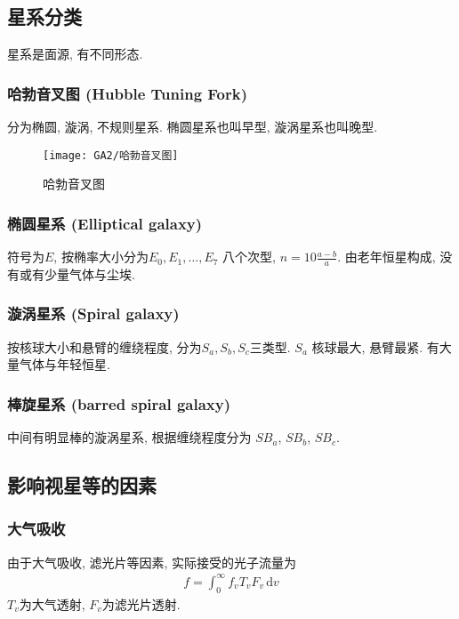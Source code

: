 \subsection{星系分类}
星系是面源, 有不同形态. 

\subsubsection{哈勃音叉图 (Hubble Tuning Fork)}

分为椭圆, 漩涡, 不规则星系. 椭圆星系也叫早型, 漩涡星系也叫晚型.

\quad

\begin{figure}[!htb]
    \centering
    \texttt{[image: GA2/哈勃音叉图]}
    \caption{哈勃音叉图}
\end{figure} 

\subsubsection{椭圆星系 (Elliptical galaxy)}
符号为$E$, 按椭率大小分为$E_0, E_1, \dots, E_7$ 八个次型, $n=10\frac{a-b}{a}$. 由老年恒星构成, 没有或有少量气体与尘埃. 

\subsubsection{漩涡星系 (Spiral galaxy)}
按核球大小和悬臂的缠绕程度, 分为$S_a, S_b, S_c$三类型. $S_a$ 核球最大, 悬臂最紧. 有大量气体与年轻恒星. 

\subsubsection{棒旋星系 (barred spiral galaxy)}
中间有明显棒的漩涡星系, 根据缠绕程度分为 $SB_{a}$, $SB_b$, $SB_c$. 

\subsection{影响视星等的因素}

\subsubsection{大气吸收} 
由于大气吸收, 滤光片等因素, 实际接受的光子流量为
\begin{align*}
    f=\int_{0}^{\infty} f_v T_v F_v \, \mathrm{d}v
\end{align*}
$T_v$为大气透射, $F_v$为滤光片透射. 

